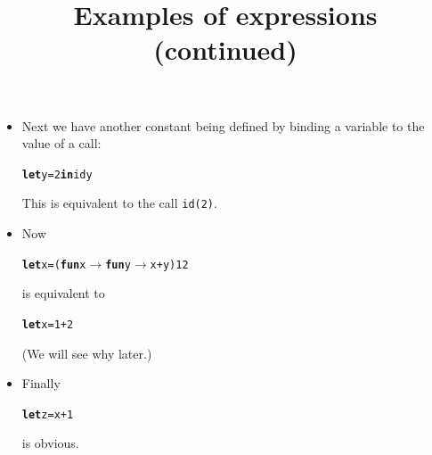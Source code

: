 \documentclass[wide]{slides}
\begin{document}
\begin{slide}
  \title{Examples of expressions (continued)}

  \begin{itemize}

    \item Next we have another constant being defined by binding a
      variable to the value of a call:
\begin{alltt}
\textbf{let} y = 2 \textbf{in} id y
\end{alltt}
      This is equivalent to the call \texttt{id(2)}.

    \item Now
\begin{alltt}
\textbf{let} x = (\textbf{fun} x \(\rightarrow\) \textbf{fun} y \(\rightarrow\) x + y) 1 2
\end{alltt}
      is equivalent to
\begin{alltt}
\textbf{let} x = 1 + 2
\end{alltt}
      (We will see why later.)

    \item Finally
\begin{alltt}
\textbf{let} z = x + 1
\end{alltt}
       is obvious.

  \end{itemize}

\end{slide}
\end{document}
